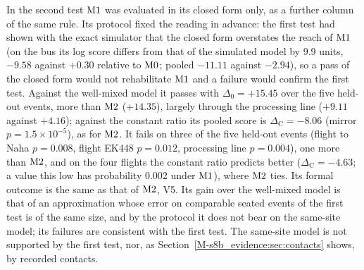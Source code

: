In the second test $\mathrm{M1}$ was evaluated in its closed form only, as a further column of the same rule. Its
protocol fixed the reading in advance: the first test had shown with the exact simulator that the closed form
overstates the reach of $\mathrm{M1}$ (on the bus its log score differs from that of the simulated model by 9.9 units,
$-9.58$ against $+0.30$ relative to $\mathrm{M0}$; pooled $-11.11$ against $-2.94$), so a pass of the closed form
would not rehabilitate $\mathrm{M1}$ and a failure would confirm the first test. Against
the well-mixed model it passes with $\Delta_0=+15.45$ over the five held-out events, more than $\mathrm{M2}$ ($+14.35$),
largely through the processing line ($+9.11$ against $+4.16$); against the constant ratio its pooled score is
$\Delta_{\mathrm{C}}=-8.06$ (mirror $p=1.5\times10^{-5}$), as for $\mathrm{M2}$. It fails on three of the five
held-out events (flight to Naha $p=0.008$, flight EK448 $p=0.012$, processing line $p=0.004$), one more than
$\mathrm{M2}$, and on the four flights the constant ratio predicts better ($\Delta_{\mathrm{C}}=-4.63$; a value this
low has probability 0.002 under $\mathrm{M1}$), where $\mathrm{M2}$ ties. Its formal outcome is the same as that of $\mathrm{M2}$,
V5. Its gain over the well-mixed model is that of an approximation whose error on comparable seated events of
the first test is of the same size, and by the protocol it does not bear on the same-site model; its failures
are consistent with the first test. The same-site model is not supported by the first test, nor, as
Section~\ref{M-s8b_evidence:sec:contacts} shows, by recorded contacts.

